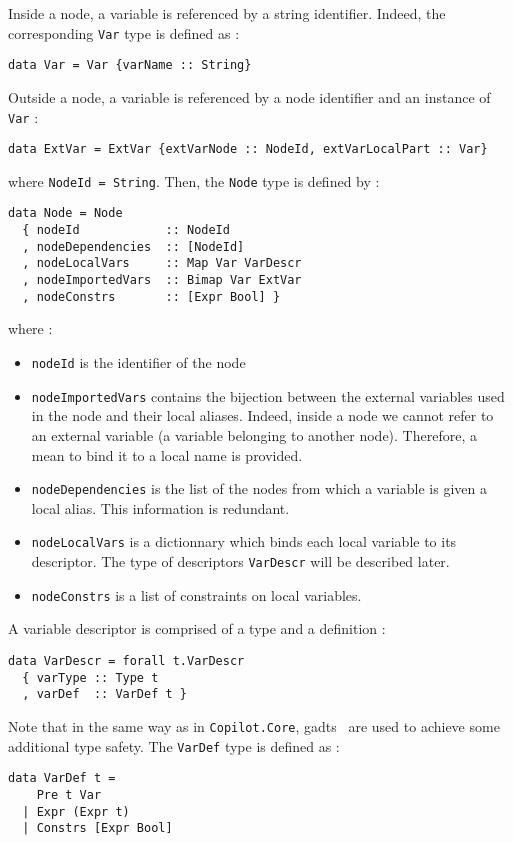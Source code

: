 Inside a node, a variable is referenced by a string identifier. Indeed, the corresponding \texttt{Var} type is defined as :
\begin{lstlisting}[frame=single]
data Var = Var {varName :: String}
\end{lstlisting}
Outside a node, a variable is referenced by a node identifier and an instance of \texttt{Var} :
\begin{lstlisting}[frame=single]
data ExtVar = ExtVar {extVarNode :: NodeId, extVarLocalPart :: Var} 
\end{lstlisting}
where \texttt{NodeId = String}. Then, the \texttt{Node} type is defined by :
\begin{lstlisting}[frame=single]
data Node = Node
  { nodeId            :: NodeId
  , nodeDependencies  :: [NodeId]
  , nodeLocalVars     :: Map Var VarDescr
  , nodeImportedVars  :: Bimap Var ExtVar 
  , nodeConstrs       :: [Expr Bool] }
\end{lstlisting} 
where :
\begin{itemize}
\item \texttt{nodeId} is the identifier of the node
\item \texttt{nodeImportedVars} contains the bijection between the external variables used in the node and their local aliases. Indeed, inside a node we cannot refer to an external variable (a variable belonging to another node). Therefore, a mean to bind it to a local name is provided.
\item \texttt{nodeDependencies} is the list of the nodes from which a variable is given a local alias. This information is redundant.
\item \texttt{nodeLocalVars} is a dictionnary which binds each local variable to its descriptor. The type of descriptors \texttt{VarDescr} will be described later.
\item \texttt{nodeConstrs} is a list of constraints on local variables.
\end{itemize}
A variable descriptor is comprised  of a type and a definition :
\begin{lstlisting}[frame=single]
data VarDescr = forall t.VarDescr
  { varType :: Type t
  , varDef  :: VarDef t }
\end{lstlisting}
Note that in the same way as in \texttt{Copilot.Core}, {\sc
  gadt}s~\cite{Xi2003,CheneyHinze03, Johann2008} are used to achieve some additional type safety. The \texttt{VarDef} type is defined as :
\begin{lstlisting}[frame=single]
data VarDef t =
    Pre t Var
  | Expr (Expr t)
  | Constrs [Expr Bool]
\end{lstlisting}
